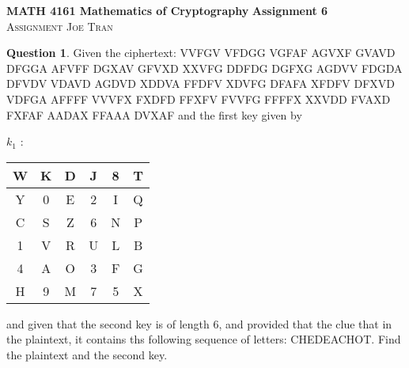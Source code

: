 \documentclass[11pt]{article}
\date{January 9, 2024}
\theoremstyle{definition}\newtheorem{definition}{Definition}
\theoremstyle{definition}\newtheorem{question}{Question}
\theoremstyle{definition}\newtheorem*{solution}{Solution}
\begin{document}
\noindent \textbf{MATH 4161 Mathematics of Cryptography} \hfill \textbf{Assignment 6} \\
\noindent \textsc{Assignment} \hfill \textsc{Joe Tran}

\begin{question}
    Given the ciphertext: VVFGV VFDGG VGFAF AGVXF GVAVD DFGGA AFVFF DGXAV GFVXD XXVFG DDFDG DGFXG AGDVV FDGDA DFVDV VDAVD AGDVD XDDVA FFDFV XDVFG DFAFA XFDFV DFXVD VDFGA AFFFF VVVFX FXDFD FFXFV FVVFG FFFFX XXVDD FVAXD FXFAF AADAX FFAAA DVXAF and the first key given by
    \begin{center}
        $k_1$ : \begin{tabular}{|c|c|c|c|c|c|} \hline
            W & K & D & J & 8 & T \\ \hline
            Y & 0 & E & 2 & I & Q \\ \hline
            C & S & Z & 6 & N & P \\ \hline
            1 & V & R & U & L & B \\ \hline
            4 & A & O & 3 & F & G \\ \hline
            H & 9 & M & 7 & 5 & X \\ \hline
        \end{tabular}
    \end{center}
    and given that the second key is of length 6, and provided that the clue that in the plaintext, it contains ths following sequence of letters: CHEDEACHOT. Find the plaintext and the second key.
\end{question}
\end{document}
